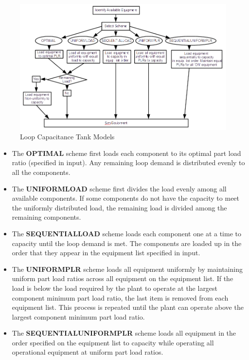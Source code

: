 \begin{figure}[hbtp] %
\centering
\includegraphics{media/image1974.png}\caption{Loop Capacitance Tank Models \protect \label{loop-capacitance-tank-models}}
\end{figure}

\begin{itemize}
\item
    The \textbf{OPTIMAL} scheme first loads each component to its optimal part load ratio (specified in input). Any remaining loop demand is distributed evenly to all the components.
\item
    The \textbf{UNIFORMLOAD} scheme first divides the load evenly among all available components.
    If some components do not have the capacity to meet the uniformly distributed load, the remaining load is divided among the remaining components.
\item
    The \textbf{SEQUENTIALLOAD} scheme loads each component one at a time to capacity until the loop demand is met.
    The components are loaded up in the order that they appear in the equipment list specified in input.
\item
    The \textbf{UNIFORMPLR} scheme loads all equipment uniformly by maintaining uniform part load ratios across all equipment on the equipment list.
    If the load is below the load required by the plant to operate at the largest component minimum part load ratio, the last item is removed from each equipment list.
    This process is repeated until the plant can operate above the largest component minimum part load ratio.
\item
    The \textbf{SEQUENTIALUNIFORMPLR} scheme loads all equipment in the order specified on the equipment list to capacity while operating all operational equipment at uniform part load ratios.
\end{itemize}

